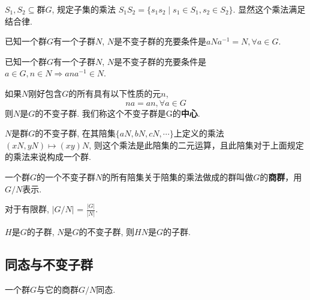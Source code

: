 \begin{Definition}
$S_1, S_2 \subseteq $群$G$, 规定子集的乘法
$S_1 S_2  = \{s_1 s_2 \mid s_1 \in S_1, s_2 \in S_2 \}$. 显然这个乘法满足结合律.
\end{Definition}

\begin{Theorem}
已知一个群$G$有一个子群$N$, $N$是不变子群的充要条件是$aNa^{-1} = N, \forall a \in G$.
\end{Theorem}

\begin{Theorem}
已知一个群$G$有一个子群$N$, $N$是不变子群的充要条件是
$a \in G, n \in N \Rightarrow ana^{-1} \in N $.
\end{Theorem}

\begin{Theorem}
如果$N$刚好包含$G$的所有具有以下性质的元$n$,
$$
	na = an, \forall a \in G
$$
则$N$是$G$的不变子群. 我们称这个不变子群是G的\textbf{中心}.
\end{Theorem}

\begin{Theorem}
$N$是群$G$的不变子群, 在其陪集$\{ aN, bN, cN, \cdots \}$上定义的乘法$(xN, yN) \mapsto (xy)N$, 则这个乘法是此陪集的二元运算，且此陪集对于上面规定的乘法来说构成一个群.
\end{Theorem}

\begin{Definition}[商群]
一个群$G$的一个不变子群$N$的所有陪集关于陪集的乘法做成的群叫做$G$的\textbf{商群}，用$G/N$表示.
\end{Definition}

\begin{Theorem}
对于有限群, $ \displaystyle | G/N | $ = $\frac{|G|}{|N|}$.
\end{Theorem}


\begin{Proposition}
$H$是$G$的子群, $N$是$G$的不变子群, 则$HN$是$G$的子群.
\end{Proposition}

\subsection{同态与不变子群}

\begin{Theorem}
一个群$G$与它的商群$G/N$同态.
\end{Theorem}

